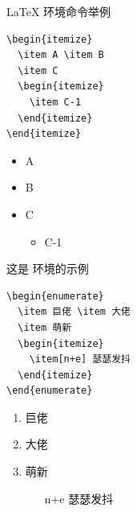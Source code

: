 \documentclass{beamer}
\begin{document}
\begin{frame}[fragile]{\LaTeX{} 环境命令举例}
    \begin{minipage}{0.5\linewidth}
\begin{verbatim}
\begin{itemize}
  \item A \item B
  \item C
  \begin{itemize}
    \item C-1
  \end{itemize}
\end{itemize}
\end{verbatim}
    \end{minipage}\hspace{1cm}
    \begin{minipage}{0.3\linewidth}
        \begin{itemize}
            \item A
            \item B
            \item C
            \begin{itemize}
                \item C-1
            \end{itemize}
        \end{itemize}
    \end{minipage}
    \medskip
    \pause
    \begin{minipage}{0.5\linewidth}
        这是  环境的示例
\begin{verbatim}
\begin{enumerate}
  \item 巨佬 \item 大佬
  \item 萌新
  \begin{itemize}
    \item[n+e] 瑟瑟发抖
  \end{itemize}
\end{enumerate}
\end{verbatim}
    \end{minipage}\hspace{1cm}
    \begin{minipage}{0.3\linewidth}
        \begin{enumerate}
            \item 巨佬
            \item 大佬
            \item 萌新
            \begin{itemize}
                \item[n+e] 瑟瑟发抖
            \end{itemize}
        \end{enumerate}
    \end{minipage}
\end{frame}
\end{document}
